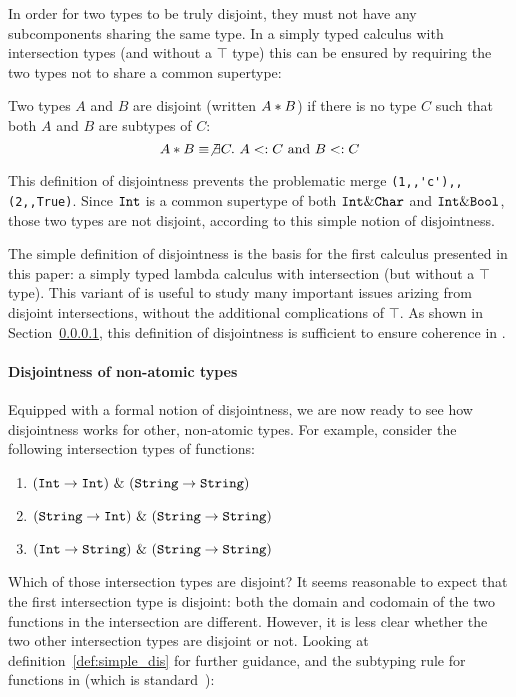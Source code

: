 In order for two types to be truly disjoint, they must not have any
subcomponents sharing the same type. In a simply typed calculus with intersection
types (and without a $\top$ type) this can be ensured by requiring the two types 
not to share a common supertype: 

\begin{definition}\label{def:simple_dis}
  Two types $A$ and $B$ are disjoint
  (written $A * B$) if there is no type $C$ such that both $A$ and $B$ are
  subtypes of $C$:
  \[A * B \equiv \not\exists C.~A <: C~\text{and}~B <: C\]
\end{definition}

\noindent This definition of disjointness prevents the problematic merge
\lstinline$(1,,'c'),,(2,,True)$. Since $\texttt{Int}$ is a
common supertype of both $\texttt{Int} \& \texttt{Char}$ and $\texttt{Int}
\& \texttt{Bool}$, those two types are not disjoint, according to this
simple notion of disjointness.

The simple definition of disjointness is the basis for the first calculus 
presented in this paper: a simply typed lambda calculus with intersection 
(but without a $\top$ type). 
This variant of \name is useful to study many 
important issues arizing from disjoint intersections, without the additional 
complications of $\top$. As shown in Section~\ref{}, this
definition of disjointness is sufficient to ensure coherence in \name.

\paragraph{Disjointness of non-atomic types} Equipped with a formal
notion of disjointness, we are now ready to see how disjointness works 
for other, non-atomic types. 
For example, consider the following intersection types of functions:

\begin{enumerate}

\item $(\texttt{Int} \to \texttt{Int})~\&~(\texttt{String} \to \texttt{String})$
\item $(\texttt{String} \to \texttt{Int})~\&~(\texttt{String} \to \texttt{String})$
\item $(\texttt{Int} \to \texttt{String})~\&~(\texttt{String} \to \texttt{String})$

\end{enumerate}

\noindent Which of those intersection types are disjoint? 
It seems reasonable to expect that the first intersection type is
disjoint: both the domain and codomain of the two functions in the
intersection are different. However, it is less clear whether the two
other intersection types are disjoint or not. Looking at 
definition~\ref{def:simple_dis} for further guidance, and the subtyping rule for functions in
\name (which is standard~\cite{cardelli}):

